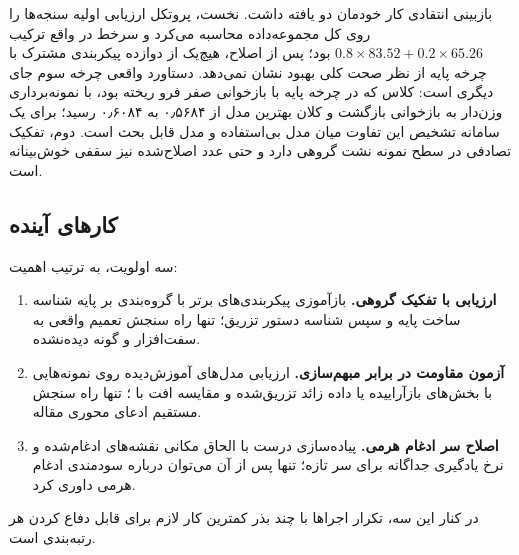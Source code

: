 بازبینی انتقادی کار خودمان دو یافته داشت. نخست، پروتکل ارزیابی اولیه سنجه‌ها را روی کل مجموعه‌داده محاسبه می‌کرد و سرخط  در واقع ترکیب $0.8 \times 83.52 + 0.2 \times 65.26$ بود؛ پس از اصلاح، هیچ‌یک از دوازده پیکربندی مشترک با چرخه پایه از نظر صحت کلی بهبود نشان نمی‌دهد. دستاورد واقعی چرخه سوم جای دیگری است: کلاس  که در چرخه پایه با بازخوانی صفر فرو ریخته بود، با نمونه‌برداری وزن‌دار به بازخوانی  بازگشت و  کلان بهترین مدل از \num{۰٫۵۶۸۴} به \num{۰٫۶۰۸۴} رسید؛ برای یک سامانه تشخیص این تفاوت میان مدل بی‌استفاده و مدل قابل بحث است. دوم، تفکیک تصادفی در سطح نمونه نشت گروهی دارد و حتی عدد اصلاح‌شده نیز سقفی خوش‌بینانه است.

\subsection{کار‌های آینده}
سه اولویت، به ترتیب اهمیت:

\begin{enumerate}[leftmargin=1.6em,itemsep=0.15em,topsep=0.25em]
    \item \textbf{ارزیابی با تفکیک گروهی.} بازآموزی پیکربندی‌های برتر با گروه‌بندی بر پایه شناسه ساخت پایه و سپس شناسه دستور تزریق؛ تنها راه سنجش تعمیم واقعی به سفت‌افزار و گونه دیده‌نشده.
    \item \textbf{آزمون مقاومت در برابر مبهم‌سازی.} ارزیابی مدل‌های آموزش‌دیده روی نمونه‌هایی با بخش‌های بازآراییده یا داده زائد تزریق‌شده و مقایسه افت  با ؛ تنها راه سنجش مستقیم ادعای محوری مقاله.
    \item \textbf{اصلاح سر ادغام هرمی.} پیاده‌سازی درست  با الحاق مکانی نقشه‌های ادغام‌شده و نرخ یادگیری جداگانه برای سر تازه؛ تنها پس از آن می‌توان درباره سودمندی ادغام هرمی داوری کرد.
\end{enumerate}

در کنار این سه، تکرار اجرا‌ها با چند بذر کمترین کار لازم برای قابل دفاع کردن هر رتبه‌بندی است.
